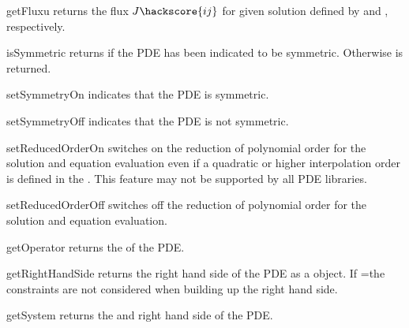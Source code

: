 \begin{methoddesc}[LinearPDE]{getFlux}{u}
returns the flux $J\hackscore{ij}$  for given solution 
defined by  and , respectively.
\end{methoddesc}


\begin{methoddesc}[LinearPDE]{isSymmetric}{}
returns \True if the PDE has been indicated to be symmetric.
Otherwise \False is returned.
\end{methoddesc}

\begin{methoddesc}[LinearPDE]{setSymmetryOn}{}
indicates that the PDE is symmetric.
\end{methoddesc}

\begin{methoddesc}[LinearPDE]{setSymmetryOff}{}
indicates that the PDE is not symmetric.
\end{methoddesc}

\begin{methoddesc}[LinearPDE]{setReducedOrderOn}{}
switches on the reduction of polynomial order for the solution and equation evaluation even if
a quadratic or higher interpolation order is defined in the \Domain. This feature may not
be supported by all PDE libraries.
\end{methoddesc}

\begin{methoddesc}[LinearPDE]{setReducedOrderOff}{}
switches off the reduction of polynomial order for the solution and
equation evaluation.
\end{methoddesc}

\begin{methoddesc}[LinearPDE]{getOperator}{}
returns the \Operator of the PDE.
\end{methoddesc}

\begin{methoddesc}[LinearPDE]{getRightHandSide}{}
returns the right hand side of the PDE as a \Data object. If
=\True the constraints are not considered
when building up the right hand side.
\end{methoddesc}

\begin{methoddesc}[LinearPDE]{getSystem}{}
returns the \Operator and right hand side of the PDE.
\end{methoddesc}

